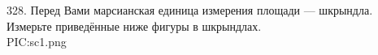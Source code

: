 328. Перед Вами марсианская единица измерения площади --- шкрындла. Измерьте приведённые ниже фигуры в
шкрындлах.\\
{{PIC:sc1.png}}\\
